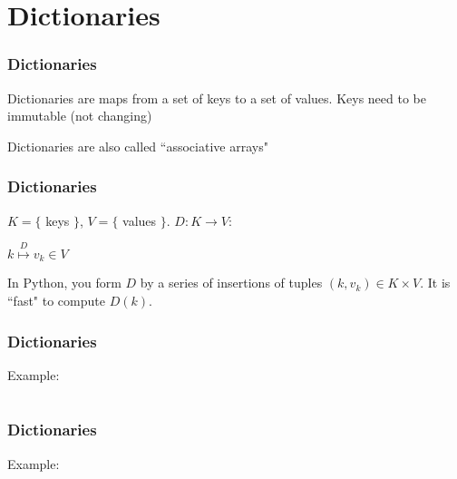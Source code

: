 \documentclass{beamer}
\begin{document}
\section{Dictionaries}

\begin{frame}
\frametitle{Dictionaries}

Dictionaries are maps from a set of keys to a set of values.  Keys need to be immutable (not changing)

\vspace{0.2in}

Dictionaries are also called ``associative arrays"
\end{frame}


\begin{frame}
\frametitle{Dictionaries}

$K = \{$ keys $\}$, $V = \{$ values $\}$.  $D: K \rightarrow V$:

\huge{
\begin{center}
$k \stackrel{D}{\longmapsto} v_k \in V$
\end{center}
} \normalsize{}

\vspace{0.2in}

In Python, you form $D$ by a series of insertions of tuples $(k, v_k) \in K \times V$.  It is ``fast" to compute $D(k)$.

\end{frame}

\begin{frame}
\frametitle{Dictionaries}

Example:

\begin{center}
\begin{tabular}{c}

\end{tabular}
\end{center}

\end{frame}


\begin{frame}
\frametitle{Dictionaries}

Example:

\begin{center}
\begin{tabular}{c}

\end{tabular}
\end{center}

\end{frame}
\end{document}
